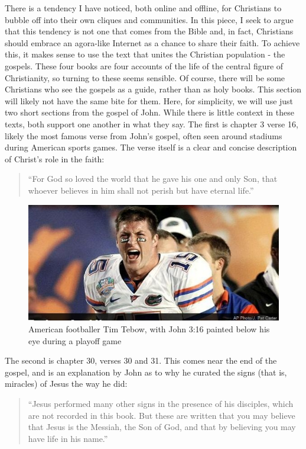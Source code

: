 \documentclass[]{article}
\begin{document}
There is a tendency I have noticed, both online and offline, for
Christians to bubble off into their own cliques and communities. In this
piece, I seek to argue that this tendency is not one that comes from the
Bible and, in fact, Christians should embrace an agora-like Internet as
a chance to share their faith. To achieve this, it makes sense to use
the text that unites the Christian population - the gospels. These four
books are four accounts of the life of the central figure of
Christianity, so turning to these seems sensible. Of course, there will
be some Christians who see the gospels as a guide, rather than as holy
books. This section will likely not have the same bite for them. Here,
for simplicity, we will use just two short sections from the gospel of
John. While there is little context in these texts, both support one
another in what they say. The first is chapter 3 verse 16, likely the
most famous verse from John's gospel, often seen around stadiums during
American sports games. The verse itself is a clear and concise
description of Christ's role in the faith:

\begin{quote}
``For God so loved the world that he gave his one and only Son, that
whoever believes in him shall not perish but have eternal
life.''\autocite[pg 1035]{HolyBibleNew2007}
\end{quote}

\begin{figure}
\centering
\includegraphics{./TimTebow.jpg}
\caption{American footballer Tim Tebow, with John 3:16 painted below his
eye during a playoff game}
\end{figure}

The second is chapter 30, verses 30 and 31. This comes near the end of
the gospel, and is an explanation by John as to why he curated the signs
(that is, miracles) of Jesus the way he did:

\begin{quote}
``Jesus performed many other signs in the presence of his disciples,
which are not recorded in this book. But these are written that you may
believe that Jesus is the Messiah, the Son of God, and that by believing
you may have life in his name.''\autocite[pg 1057]{HolyBibleNew2007}
\end{quote}
\end{document}
